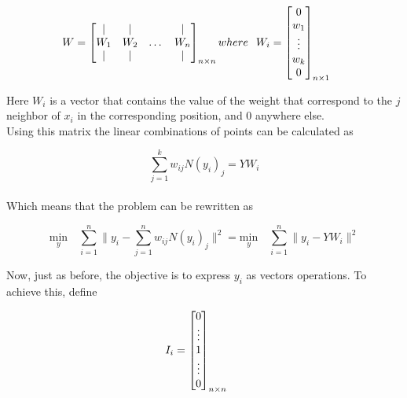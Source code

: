 \documentclass[12pt,journal]{IEEEtran}
\begin{document}
    \[
        \hspace{-0.5cm}
        W =
        \begin{bmatrix}
            |   &  |  &       & |   \\
            W_1 & W_2 & \dots & W_n \\
            |   &  |  &       & |
        \end{bmatrix}_{n \times n}
        where
        \hspace{0.25cm}
        W_i =
        \begin{bmatrix}
            0 \\
            w_1 \\
            \vdots \\
            w_k \\
            0 \\
        \end{bmatrix}_{n \times 1}
    \]

    Here $W_i$ is a vector that contains the value of the weight that correspond
    to the $j$ neighbor of $x_i$ in the corresponding position, and 0 anywhere
    else.\\

    Using this matrix the linear combinations of points can be calculated as

    \begin{equation*}
        \sum_{j=1}^k w_{ij} N(y_i)_j = Y W_i
    \end{equation*}\\

    Which means that the problem can be rewritten as

    \begin{equation*}
            \underset{y}{\text{min}} \quad \sum_{i=1}^n \lVert y_i - \sum_{j=1}^n w_{ij} N(y_i)_j \rVert^2
            =
            \underset{y}{\text{min}} \quad \sum_{i=1}^n \lVert y_i - Y W_i \rVert^2
    \end{equation*}

    \vspace{0.25cm}

    Now, just as before, the objective is to express $y_i$ as vectors operations.
    To achieve this, define

    \[
        I_i =
        \begin{bmatrix}
            0 \\
            \vdots \\
            1 \\
            \vdots \\
            0 \\
        \end{bmatrix}_{n \times n}
        \hspace{0.5cm}
    \]
\end{document}
